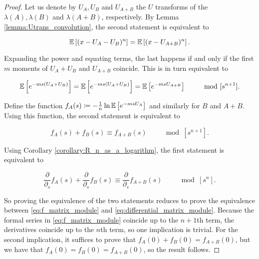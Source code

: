 \begin{proof}
    Let us denote by $U_A, U_B$ and $U_{A+B}$ the $U$ transforms of the $\lambda(A), \lambda(B)$ and $\lambda(A+B)$, respectively. By Lemma \ref{lemma:Utrans_convolution}, the second statement is equivalent to 

    \begin{equation*}
        \mathbb E \left[  (x - U_A - U_B)^n  \right] = \mathbb E \left[  (x - U_{A+B})^n  \right].
    \end{equation*}

    Expanding the power and equating terms, the last happens if and only if the first $m$ moments of $U_A + U_B$ and $U_{A+B}$ coincide. This is in turn equivalent to 

    \begin{equation*}
        \mathbb E \left[ e^{-ms(U_A + U_B)} \right] = \mathbb E \left[ e^{-ms(U_A + U_B)} \right] = \mathbb E \left[  e^{-msU_{A+B}}  \right] \qquad \mod [s^{n+1}].
    \end{equation*}

    Define the function $f_A(s) \coloneqq - \frac1n \ln \mathbb E \left[  e^{-msU_A}  \right]$ and similarly for $B$ and $A+B$. Using this function, the second statement is equivalent to 

    \begin{equation} \label{eq:f_matrix_module}
        f_A(s) + f_B(s) \equiv f_{A+B}(s) \qquad \mod [s^{n+1}].
    \end{equation}

    Using Corollary \ref{corollary:R_n_as_a_logarithm}, the first statement is equivalent to 

    \begin{equation} \label{eq:differential_matrix_module}
        \frac{\partial}{\partial_s} f_A(s) + \frac{\partial}{\partial_s} f_B(s) \equiv \frac{\partial}{\partial_s} f_{A+B}(s) \qquad \mod[s^n].
    \end{equation}

    So proving the equivalence of the two statements reduces to prove the equivalence between \eqref{eq:f_matrix_module} and \eqref{eq:differential_matrix_module}. Because the formal series in \eqref{eq:f_matrix_module} coincide up to the $n+1$th term, the derivatives coincide up to the $n$th term, so one implication is trivial. For the second implication, it suffices to prove that $f_A(0) + f_B(0) = f_{A+B}(0)$, but we have that $f_A(0)=f_B(0)=f_{A+B}(0)$, so the result follows.
\end{proof} 









